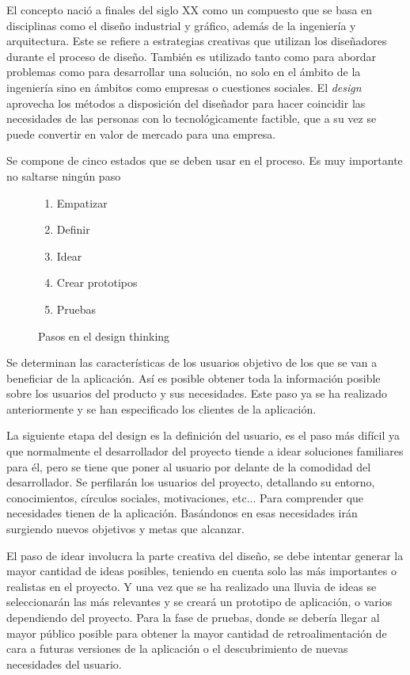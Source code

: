 El concepto nació a finales del siglo XX como un compuesto que se basa en disciplinas como el diseño industrial y gráfico, además de la ingeniería y arquitectura. Este se refiere a estrategias creativas que utilizan los diseñadores durante el proceso de diseño. También es utilizado tanto como para abordar problemas como para desarrollar una solución, no solo en el ámbito de la ingeniería sino en ámbitos como empresas o cuestiones sociales. El \emph{\gls{design}} aprovecha los métodos a disposición del diseñador para hacer coincidir las necesidades de las personas con lo tecnológicamente factible, que a su vez se puede convertir en valor de mercado para una empresa.

Se compone de cinco estados que se deben usar en el proceso. Es muy importante no saltarse ningún paso
\begin{figure}[h]
    \begin{enumerate}
        \item Empatizar
        \item Definir
        \item Idear
        \item Crear prototipos
        \item Pruebas
    \end{enumerate}
    \caption{Pasos en el design thinking}
    \label{list:stepsDesign}
\end{figure}

Se determinan las características de los usuarios objetivo de los que se van a beneficiar de la aplicación. Así es posible obtener toda la información posible sobre los usuarios del producto y sus necesidades. Este paso ya se ha realizado anteriormente y se han especificado los clientes de la aplicación.

La siguiente etapa del \gls{design} es la definición del usuario, es el paso más difícil ya que normalmente el desarrollador del proyecto tiende a idear soluciones familiares para él, pero se tiene que poner al usuario por delante de la comodidad del desarrollador. Se perfilarán los usuarios del proyecto, detallando su entorno, conocimientos, círculos sociales, motivaciones, etc... Para comprender que necesidades tienen de la aplicación. Basándonos en esas necesidades irán surgiendo nuevos objetivos y metas que alcanzar.

El paso de idear involucra la parte creativa del diseño, se debe intentar generar la mayor cantidad de ideas posibles, teniendo en cuenta solo las más importantes o realistas en el proyecto. Y una vez que se ha realizado una lluvia de ideas se seleccionarán las más relevantes y se creará un prototipo de aplicación, o varios dependiendo del proyecto. Para la fase de pruebas, donde se debería llegar al mayor público posible para obtener la mayor cantidad de retroalimentación de cara a futuras versiones de la aplicación o el descubrimiento de nuevas necesidades del usuario. \cite{wolniak2017design}

